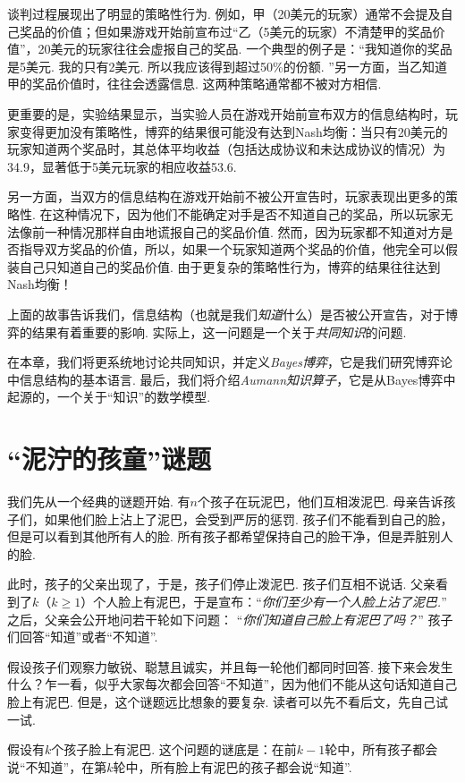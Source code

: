 谈判过程展现出了明显的策略性行为. 例如，甲（20美元的玩家）通常不会提及自己奖品的价值；但如果游戏开始前宣布过“乙（5美元的玩家）不清楚甲的奖品价值”，20美元的玩家往往会虚报自己的奖品. 一个典型的例子是：“我知道你的奖品是5美元. 我的只有2美元. 所以我应该得到超过50\%的份额. ”另一方面，当乙知道甲的奖品价值时，往往会透露信息. 这两种策略通常都不被对方相信. 

更重要的是，实验结果显示，当实验人员在游戏开始前宣布双方的信息结构时，玩家变得更加没有策略性，博弈的结果很可能没有达到Nash均衡：当只有20美元的玩家知道两个奖品时，其总体平均收益（包括达成协议和未达成协议的情况）为34.9，显著低于5美元玩家的相应收益53.6. 

另一方面，当双方的信息结构在游戏开始前不被公开宣告时，玩家表现出更多的策略性. 在这种情况下，因为他们不能确定对手是否不知道自己的奖品，所以玩家无法像前一种情况那样自由地谎报自己的奖品价值. 然而，因为玩家都不知道对方是否指导双方奖品的价值，所以，如果一个玩家知道两个奖品的价值，他完全可以假装自己只知道自己的奖品价值. 由于更复杂的策略性行为，博弈的结果往往达到Nash均衡！

上面的故事告诉我们，信息结构（也就是我们\emph{知道}什么）是否被公开宣告，对于博弈的结果有着重要的影响. 实际上，这一问题是一个关于\emph{共同知识}的问题. 

在本章，我们将更系统地讨论共同知识，并定义\emph{Bayes博弈}，它是我们研究博弈论中信息结构的基本语言. 最后，我们将介绍\emph{Aumann知识算子}，它是从Bayes博弈中起源的，一个关于“知识”的数学模型. 


\section{“泥泞的孩童”谜题}

我们先从一个经典的谜题开始. 有$n$个孩子在玩泥巴，他们互相泼泥巴. 母亲告诉孩子们，如果他们脸上沾上了泥巴，会受到严厉的惩罚. 孩子们不能看到自己的脸，但是可以看到其他所有人的脸. 所有孩子都希望保持自己的脸干净，但是弄脏别人的脸. 

此时，孩子的父亲出现了，于是，孩子们停止泼泥巴. 孩子们互相不说话. 父亲看到了$k$（$k\geq 1$）个人脸上有泥巴，于是宣布：“\emph{你们至少有一个人脸上沾了泥巴.}” 之后，父亲会公开地问若干轮如下问题： “\emph{你们知道自己脸上有泥巴了吗？}” 孩子们回答“知道”或者“不知道”. 

假设孩子们观察力敏锐、聪慧且诚实，并且每一轮他们都同时回答. 接下来会发生什么？乍一看，似乎大家每次都会回答“不知道”，因为他们不能从这句话知道自己脸上有泥巴. 但是，这个谜题远比想象的要复杂. 读者可以先不看后文，先自己试一试. 

假设有$k$个孩子脸上有泥巴. 这个问题的谜底是：在前$k-1$轮中，所有孩子都会说“不知道”，在第$k$轮中，所有脸上有泥巴的孩子都会说“知道”. 

